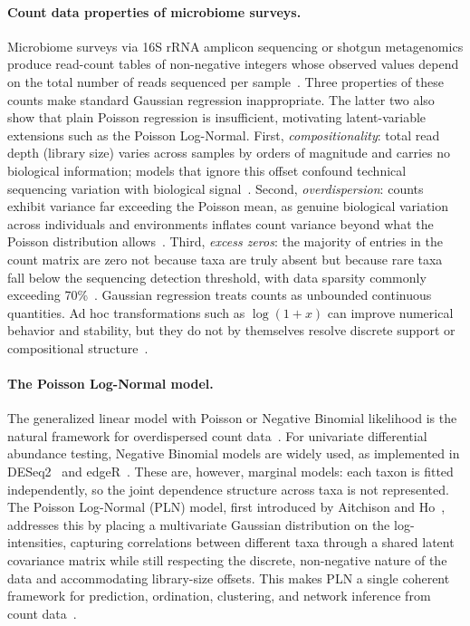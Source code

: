 \documentclass[Review,doublespace,sageh,times]{sagej}
\begin{document}
\paragraph{Count data properties of microbiome surveys.}
Microbiome surveys via 16S rRNA amplicon sequencing or shotgun metagenomics produce read-count tables of non-negative integers whose observed values depend on the total number of reads sequenced per sample~\citep{HMP2012, Thompson2017, Xia2023}.
Three properties of these counts make standard Gaussian regression inappropriate. 
The latter two also show that plain Poisson regression is insufficient, motivating latent-variable extensions such as the Poisson Log-Normal.
First, \emph{compositionality}: total read depth (library size) varies across samples by orders of magnitude and carries no biological information; models that ignore this offset confound technical sequencing variation with biological signal~\citep{mcmurdie2014waste, Xia2023}.
Second, \emph{overdispersion}: counts exhibit variance far exceeding the Poisson mean, as genuine biological variation across individuals and environments inflates count variance beyond what the Poisson distribution allows~\citep{zhang2017nbmm, McCullaghNelder1989}. 
Third, \emph{excess zeros}: the majority of entries in the count matrix are zero not because taxa are truly absent but because rare taxa fall below the sequencing detection threshold, with data sparsity commonly exceeding 70\%~\citep{Batardiere2025ZIPLN, Kodikara2022}.
Gaussian regression treats counts as unbounded continuous quantities.
Ad hoc transformations such as $\log(1+x)$ can improve numerical behavior and stability, but they do not by themselves resolve discrete support or compositional structure~\citep{booeshaghi2021log1p}.

\paragraph{The Poisson Log-Normal model.}
The generalized linear model with Poisson or Negative Binomial likelihood is the natural framework for overdispersed count data~\citep{McCullaghNelder1989}.
For univariate differential abundance testing, Negative Binomial models are widely used, as implemented in DESeq2~\citep{Love2014DESeq2} and edgeR~\citep{Robinson2010edgeR}.
These are, however, marginal models: each taxon is fitted independently, so the joint dependence structure across taxa is not represented.
The Poisson Log-Normal (PLN) model, first introduced by Aitchison and Ho~\citep{aitchison1989multivariate}, addresses this by placing a multivariate Gaussian distribution on the log-intensities, capturing correlations between different taxa through a shared latent covariance matrix while still respecting the discrete, non-negative nature of the data and accommodating library-size offsets.
This makes PLN a single coherent framework for prediction, ordination, clustering, and network inference from count data~\citep{Chiquet2021, Subedi2025}.
\end{document}
